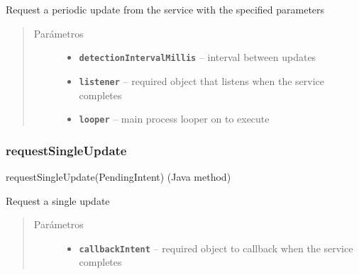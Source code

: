 \begin{fulllineitems}
\label{org/hardroid/api/ActivityRecognitionApi:org.hardroid.api.ActivityRecognitionApi.requestActivityUpdates(long, ActivityRecognitionListener, Looper)}\par
Request a periodic update from the service with the specified parameters
\begin{quote}\begin{description}
\item[{Parámetros}] \leavevmode\begin{itemize}
\item {} 
\textbf{\texttt{detectionIntervalMillis}} -- interval between updates

\item {} 
\textbf{\texttt{listener}} -- required object that listens when the service completes

\item {} 
\textbf{\texttt{looper}} -- main process looper on to execute

\end{itemize}

\end{description}\end{quote}

\end{fulllineitems}



\subsubsection{requestSingleUpdate}
\label{org/hardroid/api/ActivityRecognitionApi:requestsingleupdate}requestSingleUpdate(PendingIntent) (Java method)

\begin{fulllineitems}
\label{org/hardroid/api/ActivityRecognitionApi:org.hardroid.api.ActivityRecognitionApi.requestSingleUpdate(PendingIntent)}\par
Request a single update
\begin{quote}\begin{description}
\item[{Parámetros}] \leavevmode\begin{itemize}
\item {} 
\textbf{\texttt{callbackIntent}} -- required object to callback when the service completes

\end{itemize}

\end{description}\end{quote}

\end{fulllineitems}

